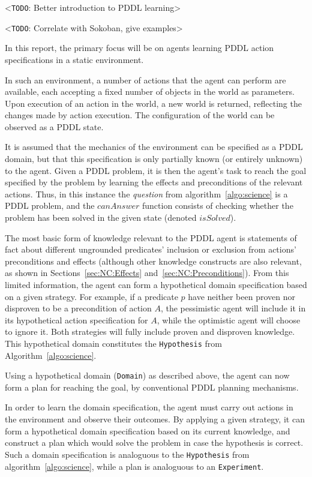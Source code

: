 \documentclass[../Master.tex]{subfiles}
\begin{document}
<\texttt{TODO}: Better introduction to PDDL learning>

<\texttt{TODO}: Correlate with Sokoban, give examples>

In this report, the primary focus will be on agents learning PDDL action specifications in a static environment.

In such an environment, a number of actions that the agent can perform are available, each accepting a fixed number of objects in the world as parameters. Upon execution of an action in the world, a new world is returned, reflecting the changes made by action execution. The configuration of the world can be observed as a PDDL state.

It is assumed that the mechanics of the environment can be specified as a PDDL domain, but that this specification is only partially known (or entirely unknown) to the agent. Given a PDDL problem, it is then the agent's task to reach the goal specified by the problem by learning the effects and preconditions of the relevant actions. Thus, in this instance the \textit{question} from algorithm~\ref{algo:science} is a PDDL problem, and the $canAnswer$ function consists of checking whether the problem has been solved in the given state (denoted $isSolved$).

The most basic form of knowledge relevant to the PDDL agent is statements of fact about different ungrounded predicates' inclusion or exclusion from actions' preconditions and effects (although other knowledge constructs are also relevant, as shown in Sections~\ref{sec:NC:Effects} and~\ref{sec:NC:Preconditions}). From this limited information, the agent can form a hypothetical domain specification based on a given strategy. For example, if a predicate $p$ have neither been proven nor disproven to be a precondition of action $A$, the pessimistic agent will include it in its hypothetical action specification for $A$, while the optimistic agent will choose to ignore it. Both strategies will fully include proven and disproven knowledge. This hypothetical domain constitutes the \texttt{Hypothesis} from Algorithm~\ref{algo:science}.

Using a hypothetical domain (\texttt{Domain}) as described above, the agent can now form a plan for reaching the goal, by conventional PDDL planning mechanisms. 

In order to learn the domain specification, the agent must carry out actions in the environment and observe their outcomes. By applying a given strategy, it can form a hypothetical domain specification based on its current knowledge, and construct a plan which would solve the problem in case the hypothesis is correct. Such a domain specification is analoguous to the \texttt{Hypothesis} from algorithm~\ref{algo:science}, while a plan is analoguous to an \texttt{Experiment}.
\end{document}
